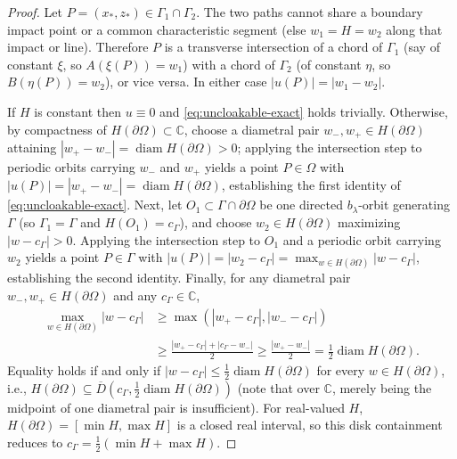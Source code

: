 \documentclass[11pt,reqno]{amsart}
\theoremstyle{definition}
\theoremstyle{remark}
\newcommand{\C}{\mathbb{C}}
\DeclareMathOperator{\diam}{diam}
\begin{document}
\begin{proof}
Let $P = (x_*, z_*) \in \Gamma_1 \cap \Gamma_2$. The two paths cannot share a boundary impact point or a common characteristic segment (else $w_1 = H = w_2$ along that impact or line). Therefore $P$ is a transverse intersection of a chord of $\Gamma_1$ (say of constant $\xi$, so $A(\xi(P)) = w_1$) with a chord of $\Gamma_2$ (of constant $\eta$, so $B(\eta(P)) = w_2$), or vice versa. In either case $|u(P)| = |w_1 - w_2|$.

If $H$ is constant then $u \equiv 0$ and \eqref{eq:uncloakable-exact} holds trivially. Otherwise, by compactness of $H(\partial\Omega) \subset \C$, choose a diametral pair $w_-, w_+ \in H(\partial\Omega)$ attaining $|w_+ - w_-| = \diam H(\partial\Omega) > 0$; applying the intersection step to periodic orbits carrying $w_-$ and $w_+$ yields a point $P \in \Omega$ with $|u(P)| = |w_+ - w_-| = \diam H(\partial\Omega)$, establishing the first identity of \eqref{eq:uncloakable-exact}. Next, let $O_1 \subset \Gamma \cap \partial\Omega$ be one directed $b_\lambda$-orbit generating $\Gamma$ (so $\Gamma_1 = \Gamma$ and $H(O_1) = c_\Gamma$), and choose $w_2 \in H(\partial\Omega)$ maximizing $|w - c_\Gamma| > 0$. Applying the intersection step to $O_1$ and a periodic orbit carrying $w_2$ yields a point $P \in \Gamma$ with $|u(P)| = |w_2 - c_\Gamma| = \max_{w \in H(\partial\Omega)} |w - c_\Gamma|$, establishing the second identity. Finally, for any diametral pair $w_-, w_+ \in H(\partial\Omega)$ and any $c_\Gamma \in \C$,
\begin{align*}
  \max_{w \in H(\partial\Omega)} |w - c_\Gamma|
  &\ge \max(|w_+ - c_\Gamma|, |w_- - c_\Gamma|) \\
  &\ge \frac{|w_+ - c_\Gamma| + |c_\Gamma - w_-|}{2}
  \ge \frac{|w_+ - w_-|}{2} = \frac{1}{2}\diam H(\partial\Omega).
\end{align*}
Equality holds if and only if $|w - c_\Gamma| \le \frac{1}{2}\diam H(\partial\Omega)$ for every $w \in H(\partial\Omega)$, i.e., $H(\partial\Omega) \subseteq \overline{D}(c_\Gamma, \frac{1}{2}\diam H(\partial\Omega))$ (note that over $\C$, merely being the midpoint of one diametral pair is insufficient). For real-valued $H$, $H(\partial\Omega) = [\min H, \max H]$ is a closed real interval, so this disk containment reduces to $c_\Gamma = \frac{1}{2}(\min H + \max H)$.
\end{proof}
\end{document}
